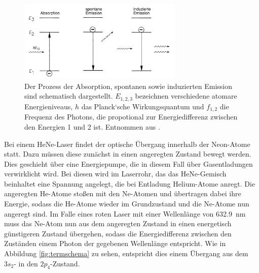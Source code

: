             \begin{figure}[h]
                \centering
                \includegraphics[width = 0.7\textwidth]{pictures/prozesse.jpg}
                \caption{Der Prozess der Absorption, spontanen sowie induzierten Emission sind schematisch dargestellt. $E_{1,2,3}$ bezeichnen verschiedene atomare Energieniveaus, $h$ das Planck`sche Wirkungsquantum und $f_{1,2}$ die Frequenz des Photons, die propotional zur Energiedifferenz zwischen den Energien 1 und 2 ist. Entnommen aus \cite{eichler_laser_2015}.}
                \label{fig:prozesse}
            \end{figure}
            
            \FloatBarrier


            Bei einem HeNe-Laser findet der optische Übergang innerhalb der Neon-Atome statt. Dazu müssen diese zunächst in einen angeregten Zustand bewegt werden. Dies geschieht über eine Energiepumpe, die 
            in diesem Fall über Gasentladungen verwirklicht wird. Bei diesen wird im Laserrohr, das das HeNe-Gemisch beinhaltet eine Spannung angelegt, die bei Entladung Helium-Atome anregt. Die angeregten 
            He-Atome stoßen mit den Ne-Atomen und übertragen dabei ihre Energie, sodass die He-Atome wieder im Grundzustand und die Ne-Atome nun angeregt sind. Im Falle eines roten Laser mit einer Wellenlänge 
            von \SI{632.9}{\nano\metre} muss das Ne-Atom nun aus dem angeregten Zustand in einen energetisch günstigeren Zustand übergehen, sodass die Energiedifferenz zwischen den Zuständen einem Photon
            der gegebenen Wellenlänge entspricht. Wie in Abbildung \ref{fig:termschema} zu sehen, entspricht dies einem Übergang aus dem $3s_2$- in den $2p_4$-Zustand.

